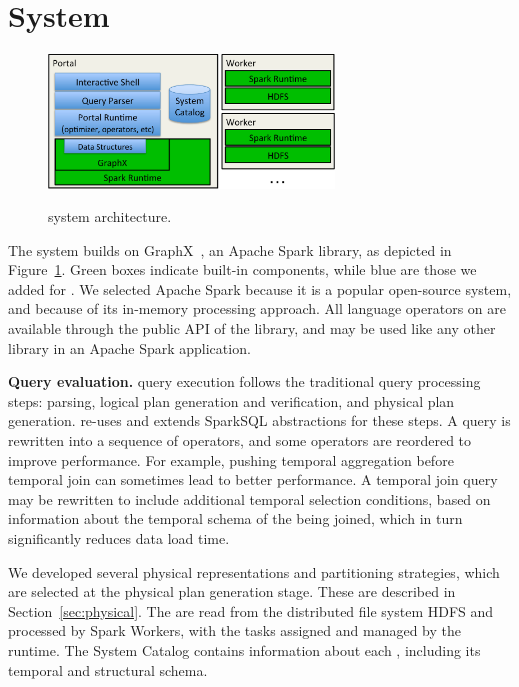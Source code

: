 \section{System}
\label{sec:sys}

\begin{figure}[t!]
\begin{center}
\includegraphics[height=1.4in]{figs/architecture.pdf}
\caption{\ql system architecture.}
\vspace{-0.5cm}
\label{fig:arch}
\vspace{-0.2cm}
\end{center}
\end{figure}

The \ql system builds on GraphX~\cite{DBLP:conf/osdi/GonzalezXDCFS14},
an Apache Spark library, as depicted in Figure~\ref{fig:arch}.  Green
boxes indicate built-in components, while blue are those we added for
\ql.  We selected Apache Spark because it is a popular open-source
system, and because of its in-memory processing approach.  All
language operators on \tgs are available through the public API of the
\ql library, and may be used like any other library in an Apache Spark
application.

{\bf Query evaluation.}  \ql query execution follows the traditional
query processing steps: parsing, logical plan generation and
verification, and physical plan generation.  \ql re-uses and extends
SparkSQL abstractions for these steps.  A \ql query is rewritten into
a sequence of operators, and some operators are reordered to improve
performance.  For example, pushing temporal aggregation before
temporal join can sometimes lead to better performance.  A temporal
join query may be rewritten to include additional temporal selection
conditions, based on information about the temporal schema of the \tgs
being joined, which in turn significantly reduces data load time.

We developed several physical representations and partitioning
strategies, which are selected at the physical plan generation stage.
These are described in Section~\ref{sec:physical}.  The \tgs are read
from the distributed file system HDFS and processed by Spark Workers,
with the tasks assigned and managed by the runtime.  The System
Catalog contains information about each \tg, including its temporal
and structural schema.


